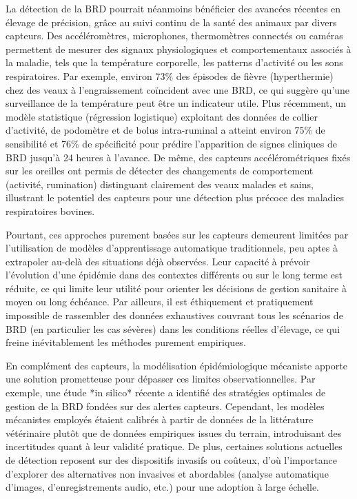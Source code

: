 La détection de la BRD pourrait néanmoins bénéficier des avancées récentes en élevage de précision, grâce au suivi continu de la santé des animaux par divers capteurs. Des accéléromètres, microphones, thermomètres connectés ou caméras permettent de mesurer des signaux physiologiques et comportementaux associés à la maladie, tels que la température corporelle, les patterns d’activité ou les sons respiratoires. Par exemple, environ 73\% des épisodes de fièvre (hyperthermie) chez des veaux à l’engraissement coïncident avec une BRD, ce qui suggère qu’une surveillance de la température peut être un indicateur utile. Plus récemment, un modèle statistique (régression logistique) exploitant des données de collier d’activité, de podomètre et de bolus intra-ruminal a atteint environ 75\% de sensibilité et 76\% de spécificité pour prédire l’apparition de signes cliniques de BRD jusqu’à 24 heures à l’avance. De même, des capteurs accélérométriques fixés sur les oreilles ont permis de détecter des changements de comportement (activité, rumination) distinguant clairement des veaux malades et sains, illustrant le potentiel des capteurs pour une détection plus précoce des maladies respiratoires bovines.

Pourtant, ces approches purement basées sur les capteurs demeurent limitées par l’utilisation de modèles d’apprentissage automatique traditionnels, peu aptes à extrapoler au-delà des situations déjà observées. Leur capacité à prévoir l’évolution d’une épidémie dans des contextes différents ou sur le long terme est réduite, ce qui limite leur utilité pour orienter les décisions de gestion sanitaire à moyen ou long échéance. Par ailleurs, il est éthiquement et pratiquement impossible de rassembler des données exhaustives couvrant tous les scénarios de BRD (en particulier les cas sévères) dans les conditions réelles d’élevage, ce qui freine inévitablement les méthodes purement empiriques. 

En complément des capteurs, la modélisation épidémiologique mécaniste apporte une solution prometteuse pour dépasser ces limites observationnelles. Par exemple, une étude *in silico* récente a identifié des stratégies optimales de gestion de la BRD fondées sur des alertes capteurs. Cependant, les modèles mécanistes employés étaient calibrés à partir de données de la littérature vétérinaire plutôt que de données empiriques issues du terrain, introduisant des incertitudes quant à leur validité pratique. De plus, certaines solutions actuelles de détection reposent sur des dispositifs invasifs ou coûteux, d’où l’importance d’explorer des alternatives non invasives et abordables (analyse automatique d’images, d’enregistrements audio, etc.) pour une adoption à large échelle. 

